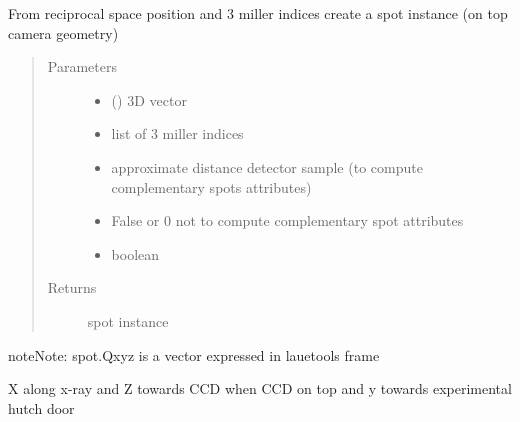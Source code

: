 \documentclass[letterpaper,10pt,english]{sphinxmanual}
\begin{document}
\begin{fulllineitems}
\label{\detokenize{Simulation_Module:LaueTools.lauecore.create_spot}}
From reciprocal space position and 3 miller indices
create a spot instance (on top camera geometry)
\begin{quote}\begin{description}
\item[{Parameters}] \leavevmode\begin{itemize}
\item {} 
 () \textendash{} 3D vector

\item {} 
 \textendash{} list of 3 miller indices

\item {} 
 \textendash{} approximate distance detector sample (to compute complementary spots attributes)

\item {} 
 \textendash{} False or 0  not to compute complementary spot attributes

\item {} 
 \textendash{} boolean

\end{itemize}

\item[{Returns}] \leavevmode
spot instance

\end{description}\end{quote}

\begin{sphinxadmonition}{note}{Note:}
spot.Qxyz is a vector expressed in lauetools frame
\end{sphinxadmonition}

X along x-ray and Z towards CCD when CCD on top and y towards experimental hutch door

\end{fulllineitems}
\end{document}
